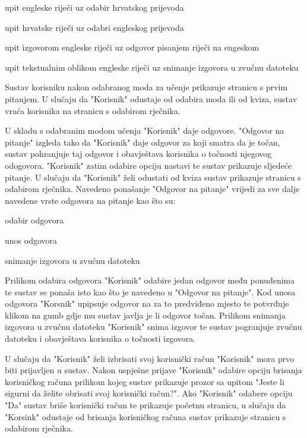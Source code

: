 \begin{packed_item}
	\item  upit engleske riječi uz odabir hrvatskog prijevoda
	\item  upit hrvatske riječi uz odabri engleskog prijevoda
	\item  upit izgovorom engleske riječi uz odgovor pisanjem riječi na engeskom
	\item  upit tekstualnim oblikom engleske riječi uz snimanje izgovora u zvučnu datoteku
\end{packed_item}

Sustav korisniku nakon odabranog moda za učenje prikazuje stranicu s prvim pitanjem. U slučaju da "Korisnik" odustaje od odabira moda ili od kviza, sustav vraća korisnika na stranicu s odabirom rječnika.

U skladu s odabranim modom učenja "Korisnik" daje odgovore. "Odgovor na pitanje" izgleda tako da "Korisnik" daje odgovor za koji smatra da je točan, sustav pohranjuje taj odgovor i obavještava korisnika o točnosti njegovog odogovora. "Korisnik" zatim odabire opciju nastavi te sustav prikazuje sljedeće pitanje. U slučaju da "Korisnik" želi odustati od kviza sustav prikazuje stranicu s odabirom rječnika. Navedeno ponašanje "Odgovor na pitanje" vrijedi za sve dalje navedene vrste odgovora na pitanje kao što su:

\begin{packed_item}
	\item  odabir odgovora
	\item  unos odgovora
	\item  snimanje izgovora u zvučnu datoteku
\end{packed_item}

Prilikom odabira odgovora "Korisnik" odabire jedan odgovor među ponuđenima te sustav se ponaša isto kao što je navedeno u "Odgovor na pitanje". Kod unosa odgovora "Korsnik" upipsuje odgovor na za to predviđeno mjesto te potvrđuje klikom na gumb gdje mu sustav javlja je li odgovor točan. Prilikom snimanja izgovora u zvučnu datoteku "Korisnik" snima izgovor te sustav pogranjuje zvučnu datoteku i obavještava korisnika o točnosti izgovora.

U slučaju da "Korisnik" želi izbrisati svoj korisnički račun "Korisnik" mora prvo biti prijavljen u sustav. Nakon uspješne prijave "Korisnik" odabire opciju brisanja korisničkog računa prilikom kojeg sustav prikazuje prozor sa upitom "Jeste li sigurni da želite obrisati svoj korisnički račun?". Ako "Korisnik" odabere opciju "Da" sustav briše korisnički račun te prikazuje početnu stranicu, u slučaju da "Korsink" odustaje od brisanja korisničkog računa sustav prikazuje stranicu s odabirom rječnika.

